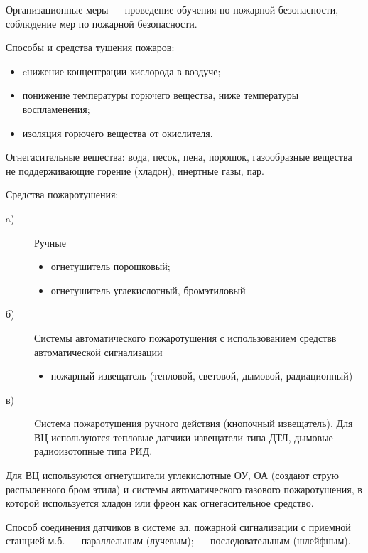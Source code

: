 Организационные меры — проведение обучения по пожарной безопасности, соблюдение мер по пожарной безопасности.

Способы и средства тушения пожаров:
\begin{itemize}
\item cнижение концентрации кислорода в воздуче;
\item понижение температуры горючего вещества, ниже температуры воспламенения;
\item изоляция горючего вещества от окислителя.
\end{itemize}

Огнегасительные вещества: вода, песок, пена, порошок, газообразные вещества не поддерживающие горение (хладон), инертные газы, пар.

Средства пожаротушения:
\begin{description}
\item[a)]Ручные
	\begin{itemize}
	\item огнетушитель порошковый;
	\item огнетушитель углекислотный, бромэтиловый
	\end{itemize}

\item[б)] Системы автоматического пожаротушения с использованием средствв автоматической сигнализации
	\begin{itemize}
	\item пожарный извещатель (тепловой, световой, дымовой, радиационный)
	\end{itemize}

\item[в)] Cистема пожаротушения ручного действия (кнопочный извещатель).
Для ВЦ используются тепловые датчики-извещатели типа ДТЛ, дымовые радиоизотопные типа РИД.
\end{description}

Для ВЦ используются огнетушители углекислотные ОУ, ОА (создают струю распыленного бром этила) и системы автоматического
газового пожаротушения, в которой используется хладон или фреон как огнегасительное средство.

Способ соединения датчиков в системе эл. пожарной сигнализации с приемной станцией м.б. — параллельным (лучевым);
— последовательным (шлейфным).

